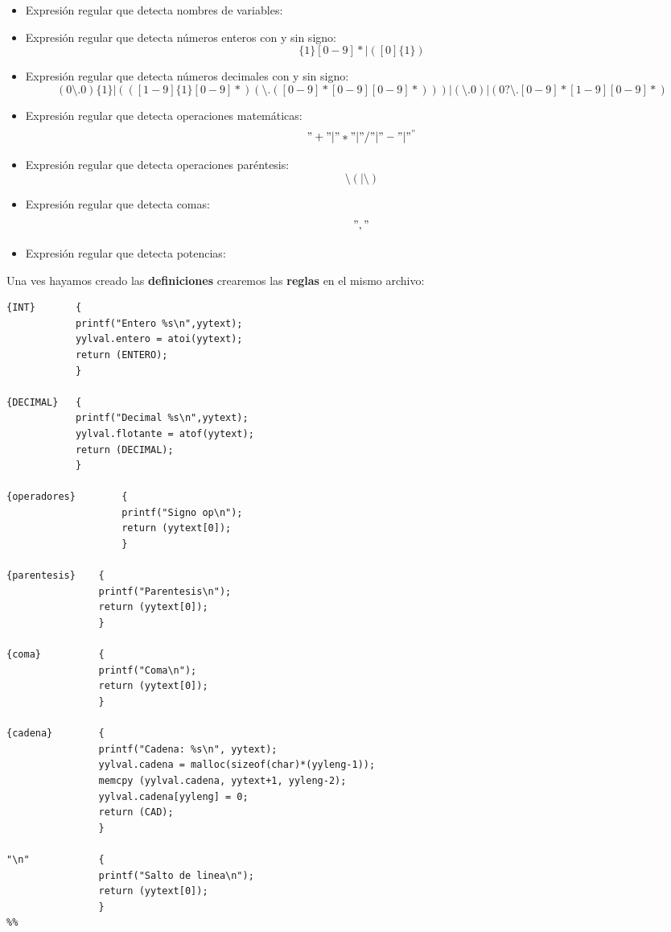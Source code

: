 \begin{itemize}
\item Expresión regular que detecta nombres de variables:
\begin{equation}
[a-zA-Z 0-9@\setminus.\_-]	
\end{equation}
\item Expresión regular que detecta números enteros con y sin signo:
\begin{equation}
[1-9]\{1\}[0-9]*|([0]\{1\})
\end{equation}
\item Expresión regular que detecta números decimales con y sin signo:
\begin{equation}
(0\setminus.0)\{1\}|(([1-9]\{1\}[0-9]*)(\setminus.([0-9]*[0-9][0-9]*)))|(\setminus.0)|(0?\setminus.[0-9]*[1-9][0-9]*)
\end{equation}
\item Expresión regular que detecta operaciones matemáticas:
\begin{equation}
"+"|"*"|"/"|"-"|"^"
\end{equation}
\item Expresión regular que detecta operaciones paréntesis:
\begin{equation}
\setminus(|\setminus)
\end{equation}
\item Expresión regular que detecta comas:
\begin{equation}
","
\end{equation}
\item Expresión regular que detecta potencias:
\begin{equation}
[pP][oO][wW]
\end{equation}
\end{itemize}

Una ves hayamos creado las \textbf{definiciones} crearemos las \textbf{reglas} en el mismo archivo:

\begin{lstlisting}
{INT} 		{
			printf("Entero %s\n",yytext);
			yylval.entero = atoi(yytext);
            return (ENTERO);
			}

{DECIMAL} 	{
			printf("Decimal %s\n",yytext);
			yylval.flotante = atof(yytext);
            return (DECIMAL);
        	}

{operadores}	 	{
					printf("Signo op\n");
                	return (yytext[0]);
                	}

{parentesis}	{
				printf("Parentesis\n");
				return (yytext[0]);
				}

{coma}			{
				printf("Coma\n");
				return (yytext[0]);
				}

{cadena}		{
				printf("Cadena: %s\n", yytext);
				yylval.cadena = malloc(sizeof(char)*(yyleng-1)); 
    			memcpy (yylval.cadena, yytext+1, yyleng-2);
    			yylval.cadena[yyleng] = 0;                
				return (CAD);
				}

"\n"            {
				printf("Salto de linea\n");
                return (yytext[0]);
                }
%%
\end{lstlisting}

